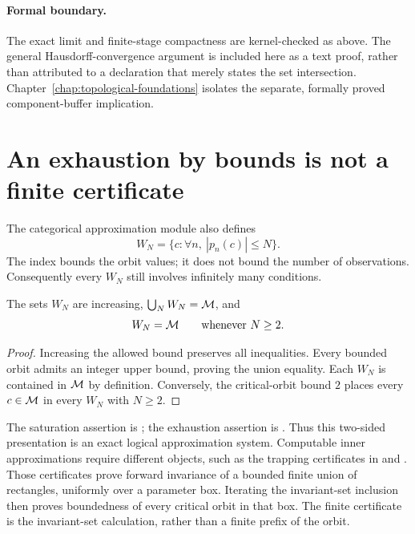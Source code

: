 \paragraph{Formal boundary.}
The exact limit and finite-stage compactness are kernel-checked as above.
The general Hausdorff-convergence argument is included here as a text
proof, rather than attributed to a declaration that merely states the
set intersection.  Chapter~\ref{chap:topological-foundations} isolates
the separate, formally proved component-buffer implication.

\section{An exhaustion by bounds is not a finite certificate}

The categorical approximation module also defines
\[
 W_N=\{c:\forall n,\ |p_n(c)|\le N\}.
\]
The index bounds the orbit values; it does not bound the number of
observations.  Consequently every $W_N$ still involves infinitely many
conditions.

\begin{proposition}
\label{prop:inner-saturation}
The sets $W_N$ are increasing, $\bigcup_N W_N=\mathcal M$, and
\[
 W_N=\mathcal M\qquad\text{whenever }N\ge2.
\]
\end{proposition}

\begin{proof}
Increasing the allowed bound preserves all inequalities.  Every bounded
orbit admits an integer upper bound, proving the union equality.
Each $W_N$ is contained in $\mathcal M$ by definition.  Conversely, the
critical-orbit bound $2$ places every $c\in\mathcal M$ in every $W_N$ with
$N\ge2$.
\end{proof}

The saturation assertion is
;
the exhaustion assertion is .
Thus this two-sided presentation is an exact logical approximation
system.  Computable inner approximations require different objects,
such as the trapping certificates in
and
.
Those certificates prove forward invariance of a bounded finite union of
rectangles, uniformly over a parameter box.  Iterating the invariant-set
inclusion then proves boundedness of every critical orbit in that box.
The finite certificate is the invariant-set calculation, rather than a
finite prefix of the orbit.

